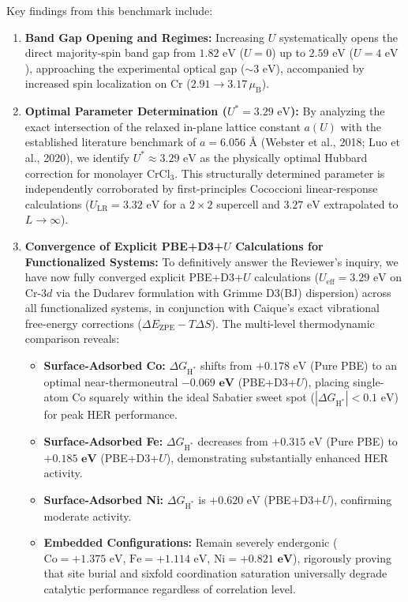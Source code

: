 \documentclass[11pt, sans, a4paper]{moderncv}
\begin{document}
Key findings from this benchmark include:
\begin{enumerate}[leftmargin=1.5em, itemsep=0.2em]
\item \textbf{Band Gap Opening and Regimes:} Increasing $U$ systematically opens the direct majority-spin band gap from $1.82\text{ eV}$ ($U=0$) up to $2.59\text{ eV}$ ($U=4\text{ eV}$), approaching the experimental optical gap ($\sim 3\text{ eV}$), accompanied by increased spin localization on Cr ($2.91 \to 3.17\,\mu_{\mathrm{B}}$).
\item \textbf{Optimal Parameter Determination ($U^* = 3.29\text{ eV}$):} By analyzing the exact intersection of the relaxed in-plane lattice constant $a(U)$ with the established literature benchmark of $a = 6.056\text{ \AA}$ (Webster et al., 2018; Luo et al., 2020), we identify $U^* \approx 3.29\text{ eV}$ as the physically optimal Hubbard correction for monolayer $\text{CrCl}_3$. This structurally determined parameter is independently corroborated by first-principles Cococcioni linear-response calculations ($U_{\text{LR}} = 3.32\text{ eV}$ for a $2\times 2$ supercell and $3.27\text{ eV}$ extrapolated to $L \to \infty$).
\item \textbf{Convergence of Explicit PBE+D3+$U$ Calculations for Functionalized Systems:} To definitively answer the Reviewer's inquiry, we have now fully converged explicit PBE+D3+$U$ calculations ($U_{\text{eff}} = 3.29\text{ eV}$ on Cr-$3d$ via the Dudarev formulation with Grimme D3(BJ) dispersion) across all functionalized systems, in conjunction with Caique's exact vibrational free-energy corrections ($\Delta E_{\text{ZPE}} - T\Delta S$). The multi-level thermodynamic comparison reveals:
\begin{itemize}[leftmargin=1.2em, itemsep=0.1em]
\item \textbf{Surface-Adsorbed Co:} $\Delta G_{\mathrm{H}^*}$ shifts from $+0.178\text{ eV}$ (Pure PBE) to an optimal near-thermoneutral $\mathbf{-0.069\text{ eV}}$ (PBE+D3+$U$), placing single-atom Co squarely within the ideal Sabatier sweet spot ($|\Delta G_{\mathrm{H}^*}| < 0.1\text{ eV}$) for peak HER performance.
\item \textbf{Surface-Adsorbed Fe:} $\Delta G_{\mathrm{H}^*}$ decreases from $+0.315\text{ eV}$ (Pure PBE) to $\mathbf{+0.185\text{ eV}}$ (PBE+D3+$U$), demonstrating substantially enhanced HER activity.
\item \textbf{Surface-Adsorbed Ni:} $\Delta G_{\mathrm{H}^*}$ is $+0.620\text{ eV}$ (PBE+D3+$U$), confirming moderate activity.
\item \textbf{Embedded Configurations:} Remain severely endergonic ($\text{Co} = +1.375\text{ eV}$, $\text{Fe} = +1.114\text{ eV}$, $\text{Ni} = \mathbf{+0.821\text{ eV}}$), rigorously proving that site burial and sixfold coordination saturation universally degrade catalytic performance regardless of correlation level.

\end{itemize}
\end{enumerate}
\end{document}
